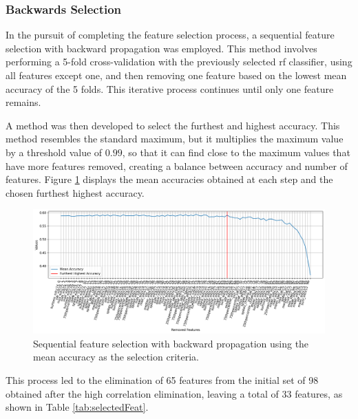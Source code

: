 \subsubsection{Backwards Selection}

In the pursuit of completing the feature selection process, a sequential feature selection with backward propagation was employed. This method involves performing a 5-fold cross-validation with the previously selected \ac{rf} classifier, using all features except one, and then removing one feature based on the lowest mean accuracy of the 5 folds. This iterative process continues until only one feature remains.

A method was then developed to select the furthest and highest accuracy. This method resembles the standard maximum, but it multiplies the maximum value by a threshold value of $0.99$, so that it can find close to the maximum values that have more features removed, creating a balance between accuracy and number of features. Figure \ref{fig:backProp1} displays the mean accuracies obtained at each step and the chosen furthest highest accuracy.

\begin{figure}[H]
	\centering
	\includegraphics[width=1\linewidth]{figs/4_1_traditional/backProp1.png}
	\caption{Sequential feature selection with backward propagation using the mean accuracy as the selection criteria.}
	\label{fig:backProp1}
\end{figure}

This process led to the elimination of 65 features from the initial set of 98 obtained after the high correlation elimination, leaving a total of 33 features, as shown in Table \ref{tab:selectedFeat}.

